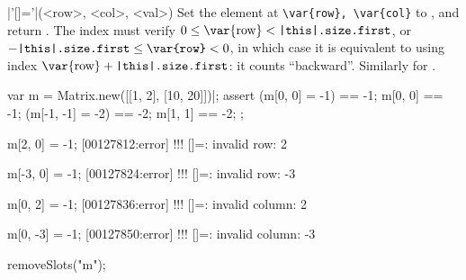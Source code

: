 \begin{urbiscriptapi}
\item|'[]='|(<row>, <col>, <val>)%
  Set the element at \lstinline|\var{row}, \var{col}| to , and
  return .  The index  must verify $0 \le
  \textrm{\var{row}} < \texttt{\this.size.first}$, or
  $-\texttt{\this.size.first} \le \texttt{\var{row}} < 0$, in which case it
  is equivalent to using index $\textrm{\var{row}} +
  \texttt{\this.size.first}$: it counts ``backward''.  Similarly for
  .
\begin{urbiscript}
var m = Matrix.new([[1, 2], [10, 20]])|;
assert
{
  (m[0, 0]  = -1) == -1;   m[0, 0] == -1;
  (m[-1, -1] = -2) == -2;  m[1, 1] == -2;
};

m[2, 0] = -1;
[00127812:error] !!! []=: invalid row: 2

m[-3, 0] = -1;
[00127824:error] !!! []=: invalid row: -3

m[0, 2] = -1;
[00127836:error] !!! []=: invalid column: 2

m[0, -3] = -1;
[00127850:error] !!! []=: invalid column: -3
\end{urbiscript}
\begin{urbicomment}
  removeSlots("m");
\end{urbicomment}

\end{urbiscriptapi}

